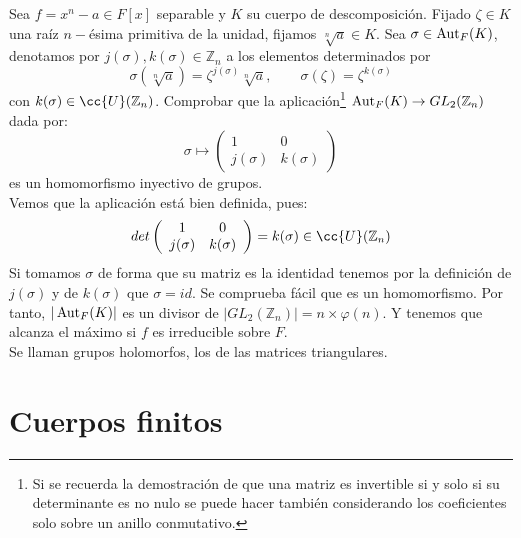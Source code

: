 \begin{ejercicio} %
    Sea $f=x^n-a\in F[x]$ separable y $K$ su cuerpo de descomposición. Fijado $\zeta\in K$ una raíz $n-$ésima primitiva de la unidad, fijamos $\sqrt[n]{a}\in K$. Sea $\sigma\in \operatorname{Aut}_F(K)$, denotamos por $j(\sigma),k(\sigma)\in \mathbb{Z}_n$ a los elementos determinados por 
    \begin{equation*}
        \sigma\left(\sqrt[n]{a}\right) = \zeta^{j(\sigma)}\sqrt[n]{a}, \qquad \sigma(\zeta) = \zeta^{k(\sigma)}
    \end{equation*}
    con $k(\sigma)\in \cc{U}(\mathbb{Z}_n)$. Comprobar que la aplicación\footnote{Si se recuerda la demostración de que una matriz es invertible si y solo si su determinante es no nulo se puede hacer también considerando los coeficientes solo sobre un anillo conmutativo.} $\operatorname{Aut}_F(K)\to GL_2(\mathbb{Z}_n)$ dada por:
    \begin{equation*}
        \sigma\longmapsto \left(\begin{array}{cc}
            1 & 0 \\
            j(\sigma) & k(\sigma) 
        \end{array}\right)
    \end{equation*}
    es un homomorfismo inyectivo de grupos.\\

    \noindent
    Vemos que la aplicación está bien definida, pues:
    \begin{equation*}
        det\left(\begin{array}{cc}
            1 & 0 \\
            j(\sigma) &  k(\sigma)
        \end{array}\right) = k(\sigma) \in \cc{U}(\mathbb{Z}_n)
    \end{equation*}
    Si tomamos $\sigma$ de forma que su matriz es la identidad tenemos por la definición de $j(\sigma)$ y de $k(\sigma)$ que $\sigma = id$. Se comprueba fácil que es un homomorfismo. Por tanto, $|\operatorname{Aut}_F(K)|$ es un divisor de $|GL_2(\mathbb{Z}_n)| = n\times \varphi(n)$. Y tenemos que alcanza el máximo si $f$ es irreducible sobre $F$.\\

    \noindent
    Se llaman grupos holomorfos, los de las matrices triangulares.
\end{ejercicio}

\section{Cuerpos finitos}

